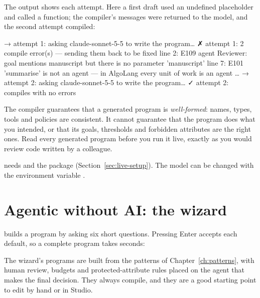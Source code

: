 The output shows each attempt. Here a first draft used an undefined placeholder and called a function; the compiler's messages were returned to the model, and the second attempt compiled:

\begin{terminal}
→ attempt 1: asking claude-sonnet-5-5 to write the program…
✗ attempt 1: 2 compile error(s) — sending them back to be fixed
    line 2: E109 agent Reviewer: goal mentions {manuscript} but there is no parameter 'manuscript'
    line 7: E101 'summarise' is not an agent — in AlgoLang every unit of work is an agent …
→ attempt 2: asking claude-sonnet-5-5 to write the program…
✓ attempt 2: compiles with no errors
\end{terminal}

\begin{ethics}
The compiler guarantees that a generated program is \emph{well-formed}: names, types, tools and policies are consistent. It cannot guarantee that the program does what you intended, or that its goals, thresholds and forbidden attributes are the right ones. Read every generated program before you run it live, exactly as you would review code written by a colleague.
\end{ethics}

 needs  and the  package (Section~\ref{sec:live-setup}). The model can be changed with the environment variable .

\section{Agentic without AI: the wizard}

 builds a program by asking six short questions. Pressing Enter accepts each default, so a complete program takes seconds:


The wizard's programs are built from the patterns of Chapter~\ref{ch:patterns}, with human review, budgets and protected-attribute rules placed on the agent that makes the final decision. They always compile, and they are a good starting point to edit by hand or in Studio.
